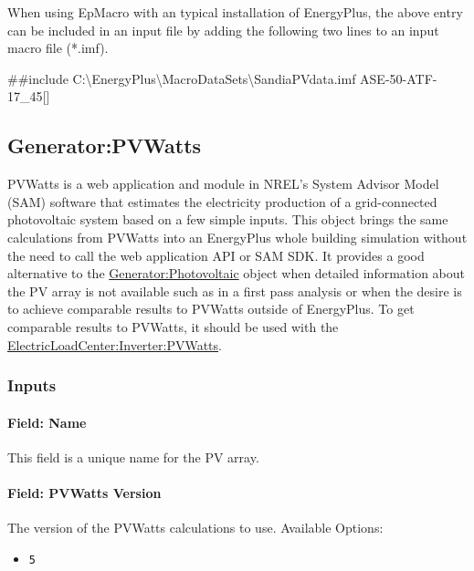 When using EpMacro with an typical installation of EnergyPlus, the above entry can be included in an input file by adding the following two lines to an input macro file (*.imf).

\#\#include C:\textbackslash{}EnergyPlus\textbackslash{}MacroDataSets\textbackslash{}SandiaPVdata.imf ASE-50-ATF-17\_45{[]}

\subsection{Generator:PVWatts}\label{generatorpvwatts}

PVWatts is a web application and module in NREL's System Advisor Model (SAM) software that estimates the electricity production of a grid-connected photovoltaic system based on a few simple inputs. This object brings the same calculations from PVWatts into an EnergyPlus whole building simulation without the need to call the web application API or SAM SDK. It provides a good alternative to the \hyperref[generatorphotovoltaic-000]{Generator:Photovoltaic} object when detailed information about the PV array is not available such as in a first pass analysis or when the desire is to achieve comparable results to PVWatts outside of EnergyPlus. To get comparable results to PVWatts, it should be used with the \hyperref[electricloadcenterinverterpvwatts]{ElectricLoadCenter:Inverter:PVWatts}.

\subsubsection{Inputs}\label{input-description}

\paragraph{Field: Name}\label{generatorpvwatts-field-name}

This field is a unique name for the PV array.

\paragraph{Field: PVWatts Version}\label{field-pvwatts-version}

The version of the PVWatts calculations to use. Available Options:

\begin{itemize}
\tightlist
\item
  \texttt{5}
\end{itemize}

